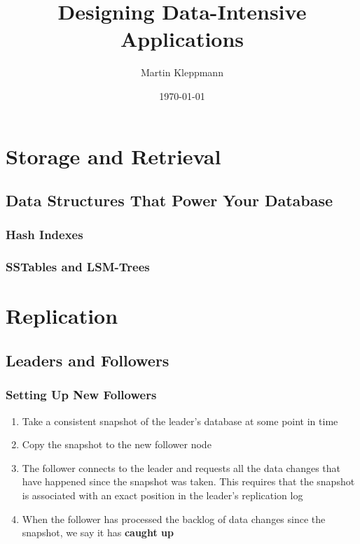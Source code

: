 \documentclass[11pt]{article}
\author{Martin Kleppmann}
\date{\today}
\title{Designing Data-Intensive Applications}
\begin{document}
\maketitle
\tableofcontents

\section{Storage and Retrieval}
\label{sec:org7bf51a4}

\subsection{Data Structures That Power Your Database}
\label{sec:org7158a46}

\subsubsection{Hash Indexes}
\label{sec:orgace6a7a}

\subsubsection{SSTables and LSM-Trees}
\label{sec:org1fb15ec}
\section{Replication}
\label{sec:org3fc2967}
\subsection{Leaders and Followers}
\label{sec:org21769ce}
\subsubsection{Setting Up New Followers}
\label{sec:orgfabea72}
\begin{enumerate}
\item Take a consistent snapshot of the leader's database at some point in time
\item Copy the snapshot to the new follower node
\item The follower connects to the leader and requests all the data changes that have happened
since the snapshot was taken. This requires that the snapshot is associated with an exact
position in the leader's replication log
\item When the follower has processed the backlog of data changes since the snapshot, we say it has
\textbf{caught up}
\end{enumerate}
\end{document}
